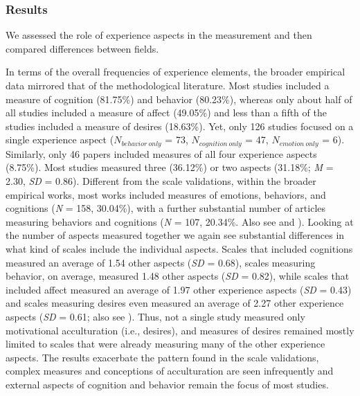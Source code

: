 \subsubsection{Results}

We assessed the role of experience aspects in the measurement and then
compared differences between fields.

In terms of the overall frequencies of experience elements, the broader
empirical data mirrored that of the methodological literature. Most
studies included a measure of cognition (81.75\%) and behavior
(80.23\%), whereas only about half of all studies included a measure of
affect (49.05\%) and less than a fifth of the studies included a measure
of desires (18.63\%). Yet, only 126 studies focused on a single
experience aspect (\(N_{behavior\ only}\) = 73, \(N_{cognition\ only}\)
= 47, \(N_{emotion\ only}\) = 6). Similarly, only 46 papers included
measures of all four experience aspects (8.75\%). Most studies measured
three (36.12\%) or two aspects (31.18\%; \textit{M} = 2.30, \textit{SD}
= 0.86). Different from the scale validations, within the broader
empirical works, most works included measures of emotions, behaviors,
and cognitions (\textit{N} = 158, 30.04\%), with a further substantial
number of articles measuring behaviors and cognitions (\textit{N} = 107,
20.34\%. Also see  and
). Looking at the number of aspects
measured together we again see substantial differences in what kind of
scales include the individual aspects. Scales that included cognitions
measured an average of 1.54 other aspects (\textit{SD} = 0.68), scales
measuring behavior, on average, measured 1.48 other aspects (\textit{SD}
= 0.82), while scales that included affect measured an average of 1.97
other experience aspects (\textit{SD} = 0.43) and scales measuring
desires even measured an average of 2.27 other experience aspects
(\textit{SD} = 0.61; also see ). Thus,
not a single study measured only motivational acculturation (i.e.,
desires), and measures of desires remained mostly limited to scales that
were already measuring many of the other experience aspects. The results
exacerbate the pattern found in the scale validations, complex measures
and conceptions of acculturation are seen infrequently and external
aspects of cognition and behavior remain the focus of most studies.

